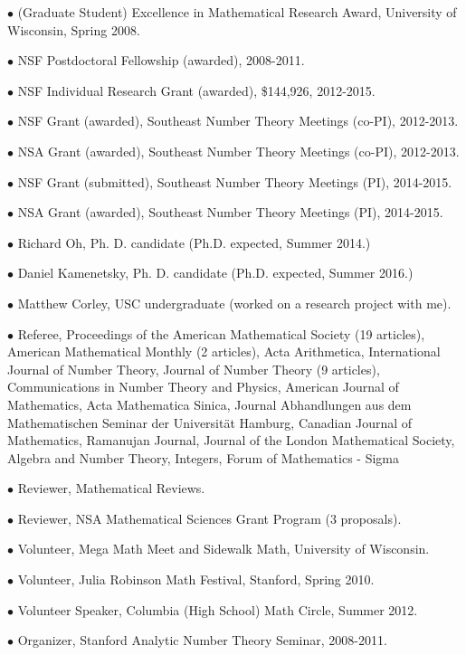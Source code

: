 \documentclass{article}
\newcommand{\categorywidth}{1in}        %
\newcommand{\categorysep}{5pt}
\newcommand{\catlistlabel}[1]%
{\raisebox{0pt}[1ex][0pt]{\makebox[\labelwidth][l]%
    {\parbox[t]{\labelwidth}{\hspace{0pt}\textbf{#1}}}}}
\newenvironment{categories}{\begin{list}{}{
      \setlength{\labelwidth}{\categorywidth}
      \setlength{\leftmargin}{\labelwidth}
      \addtolength{\leftmargin}{\labelsep}
      \setlength{\topsep}{20pt}
      \setlength{\itemsep}{\categorysep}
      \renewcommand{\makelabel}{\catlistlabel}
      }}{\end{list}}
\newcommand{\category}[1]{\item[#1]}
\begin{document}
\begin{flushleft}
\begin{categories}
{  $\bullet$ {(Graduate Student) Excellence in Mathematical Research Award, University of Wisconsin, Spring 2008.}

  $\bullet$ {NSF Postdoctoral Fellowship (awarded), 2008-2011.}

  $\bullet$ {NSF Individual Research Grant (awarded), \$144,926, 2012-2015.}

  $\bullet$ {NSF Grant (awarded), Southeast Number Theory Meetings (co-PI), 2012-2013.}

  $\bullet$ {NSA Grant (awarded), Southeast Number Theory Meetings (co-PI), 2012-2013.}

  $\bullet$ {NSF Grant (submitted), Southeast Number Theory Meetings (PI), 2014-2015.}

  $\bullet$ {NSA Grant (awarded), Southeast Number Theory Meetings (PI), 2014-2015.}

\category{Students \\ Supervised}
$\bullet$ Richard Oh, Ph. D. candidate (Ph.D. expected, Summer 2014.)

$\bullet$ Daniel Kamenetsky, Ph. D. candidate (Ph.D. expected, Summer 2016.)

$\bullet$ Matthew Corley, USC undergraduate (worked on a research project with me).

\category{Professional Service} 
$\bullet$ {Referee, Proceedings of the American Mathematical Society (19 articles),
American Mathematical Monthly (2 articles),
Acta Arithmetica,
International Journal of Number Theory, 
Journal of Number Theory (9 articles), 
Communications in Number Theory and Physics,
American Journal of Mathematics, Acta Mathematica Sinica,
Journal Abhandlungen aus dem Mathematischen Seminar der Universit\"at Hamburg,
Canadian Journal of Mathematics,
Ramanujan Journal,
Journal of the London Mathematical Society,
Algebra and Number Theory,
Integers,
Forum of Mathematics - Sigma}

$\bullet$ {Reviewer, Mathematical Reviews.}

$\bullet$ {Reviewer, NSA Mathematical Sciences Grant Program (3 proposals).}

$\bullet$ {Volunteer, Mega Math Meet and Sidewalk Math, University of Wisconsin.}

$\bullet$ {Volunteer, Julia Robinson Math Festival, Stanford, Spring 2010.}
 
$\bullet$ {Volunteer Speaker, Columbia (High School) Math Circle, Summer 2012.}

$\bullet$ Organizer, Stanford Analytic Number Theory Seminar, 2008-2011.

}
\end{categories}
\end{flushleft}
\end{document}
